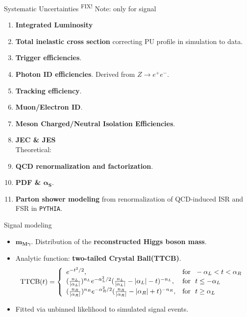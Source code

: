 \documentclass[9pt,aspectratio=1610]{beamer}
\newcommand{\khl}[1]{\textbf{\color{structure}#1}}
\newcommand{\ktodo}[1]{\colorbox{yellow!30}{{\color{red}\textsuperscript{\tiny FIX! }}#1}}
\begin{document}
\begin{frame}{Systematic Uncertainties}
	\ktodo{Note: only for signal}
	\begin{enumerate}
		\item \textbf{Integrated Luminosity}
		\item \textbf{Total inelastic cross section} correcting PU profile in simulation to data.
		\item \textbf{Trigger efficiencies}.
		\item \textbf{Photon ID efficiencies}. Derived from \(Z\rightarrow e^+e^-\).
		\item \textbf{Tracking efficiency}.
		\item \textbf{Muon/Electron ID}.
		\item \textbf{Meson Charged/Neutral Isolation Efficiencies}.
		\item \textbf{JEC \& JES}\\
		\vspace{1em}
		Theoretical:\\
		\item \textbf{QCD renormalization and factorization}.
		\item \textbf{PDF \& \(\mathbf{\alpha_S}\)}.
		\item \textbf{Parton shower modeling} from renormalization of QCD-induced ISR and FSR in \texttt{PYTHIA}.
	\end{enumerate}
\end{frame}

\begin{frame}{Signal modeling}
	\begin{itemize}
		\item \khl{\(\mathbf{m_{M\gamma}}\)}. Distribution of the \khl{reconstructed Higgs boson mass}.
		\item Analytic function: \textbf{two-tailed Crystal Ball(TTCB)}.
		\begin{align*}
			\label{eq:ttcb}
			\mathrm{TTCB}(t) = \left\{
			\begin{array}{l l}
				e^{-t^2/2}, & \mathrm{for}~~-\alpha_L<t<\alpha_R\\
				(\frac{n_L}{|\alpha_L|})^{n_{L}}e^{-\alpha_L^2/2}(\frac{n_L}{|\alpha_L|}-|\alpha_L|-t)^{-n_{L}}, & \mathrm{for}~~t\leq-\alpha_L\\
				(\frac{n_R}{|\alpha_R|})^{n_{R}}e^{-\alpha_R^2/2}(\frac{n_R}{|\alpha_R|}-|\alpha_R|+t)^{-n_{R}}, & \mathrm{for}~~t\geq\alpha_L\\
			\end{array} \right.
		\end{align*}
		\item Fitted via unbinned likelihood to simulated signal events.
	\end{itemize}
\end{frame}
\end{document}
